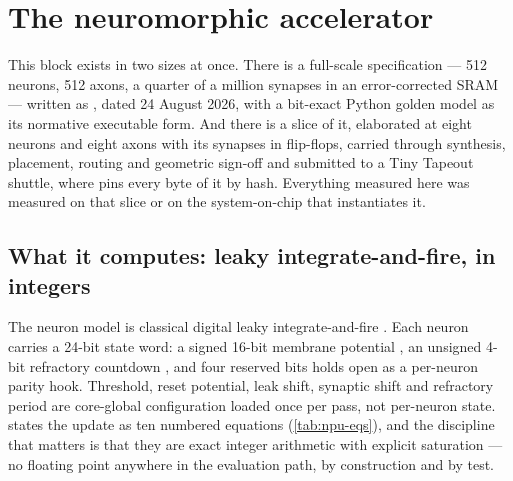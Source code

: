 
\chapter{The neuromorphic accelerator}
\label{ch:npu}

This block exists in two sizes at once. There is a full-scale
specification --- 512 neurons, 512 axons, a quarter of a million
synapses in an error-corrected SRAM --- written as , dated
24 August 2026, with a bit-exact Python golden model as its normative
executable form. And there is a slice of it, elaborated at eight
neurons and eight axons with its synapses in flip-flops, carried
through synthesis, placement, routing and geometric sign-off and
submitted to a Tiny Tapeout shuttle, where  pins every byte
of it by hash. Everything measured here was measured on that slice or
on the system-on-chip that instantiates it.

\section{What it computes: leaky integrate-and-fire, in integers}

The neuron model is classical digital leaky integrate-and-fire
\cite{frenkel2019}. Each
neuron carries a 24-bit state word: a signed 16-bit membrane potential
, an unsigned 4-bit refractory countdown , and four
reserved bits  holds open as a per-neuron parity
hook. Threshold, reset potential, leak shift, synaptic shift and
refractory period are core-global configuration loaded once per pass,
not per-neuron state.  states the update as ten
numbered equations (\cref{tab:npu-eqs}), and the discipline that
matters is that they are exact integer arithmetic with explicit
saturation --- no floating point anywhere in the evaluation path, by
construction and by test.

